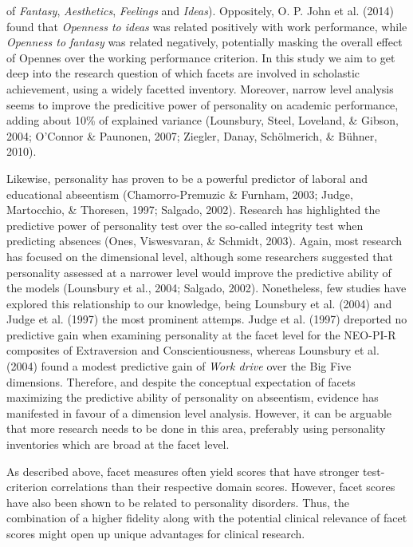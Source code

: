 \documentclass[,man,floatsintext]{apa6}
\begin{document}
of \emph{Fantasy}, \emph{Aesthetics}, \emph{Feelings} and \emph{Ideas}).
Oppositely, O. P. John et al. (2014) found that \emph{Openness to ideas}
was related positively with work performance, while \emph{Openness to
fantasy} was related negatively, potentially masking the overall effect
of Opennes over the working performance criterion. In this study we aim
to get deep into the research question of which facets are involved in
scholastic achievement, using a widely facetted inventory. Moreover,
narrow level analysis seems to improve the predicitive power of
personality on academic performance, adding about 10\% of explained
variance (Lounsbury, Steel, Loveland, \& Gibson, 2004; O'Connor \&
Paunonen, 2007; Ziegler, Danay, Schölmerich, \& Bühner, 2010).

Likewise, personality has proven to be a powerful predictor of laboral
and educational abseentism (Chamorro-Premuzic \& Furnham, 2003; Judge,
Martocchio, \& Thoresen, 1997; Salgado, 2002). Research has highlighted
the predictive power of personality test over the so-called integrity
test when predicting absences (Ones, Viswesvaran, \& Schmidt, 2003).
Again, most research has focused on the dimensional level, although some
researchers suggested that personality assessed at a narrower level
would improve the predictive ability of the models (Lounsbury et al.,
2004; Salgado, 2002). Nonetheless, few studies have explored this
relationship to our knowledge, being Lounsbury et al. (2004) and Judge
et al. (1997) the most prominent attemps. Judge et al. (1997) dreported
no predictive gain when examining personality at the facet level for the
NEO-PI-R composites of Extraversion and Conscientiousness, whereas
Lounsbury et al. (2004) found a modest predictive gain of \emph{Work
drive} over the Big Five dimensions. Therefore, and despite the
conceptual expectation of facets maximizing the predictive ability of
personality on abseentism, evidence has manifested in favour of a
dimension level analysis. However, it can be arguable that more research
needs to be done in this area, preferably using personality inventories
which are broad at the facet level.

As described above, facet measures often yield scores that have stronger
test-criterion correlations than their respective domain scores.
However, facet scores have also been shown to be related to personality
disorders. Thus, the combination of a higher fidelity along with the
potential clinical relevance of facet scores might open up unique
advantages for clinical research.
\end{document}
